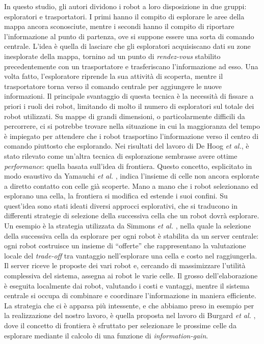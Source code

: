 In questo studio, gli autori dividono i robot a loro disposizione in due gruppi: esploratori e trasportatori. 
I primi hanno il compito di esplorare le aree della mappa ancora sconosciute, mentre i secondi hanno il compito di riportare l'informazione al punto di partenza, ove si suppone essere una sorta di comando centrale. 
L'idea è quella di lasciare che gli esploratori acquisiscano dati su zone inesplorate della mappa, tornino ad un punto di \textit{rendez-vous} stabilito precedentemente con un trasportatore e trasferiscano l'informazione ad esso. 
Una volta fatto, l'esploratore riprende la sua attività di scoperta, mentre il trasportatore torna verso il comando centrale per aggiungere le nuove informazioni. 
Il principale svantaggio di questa tecnica è la necessità di fissare a priori i ruoli dei robot, limitando di molto il numero di esploratori sul totale dei robot utilizzati. 
Su mappe di grandi dimensioni, o particolarmente difficili da percorrere, ci si potrebbe trovare nella situazione in cui la maggioranza del tempo è impiegato per attendere che i robot trasportino l'informazione verso il centro di comando piuttosto che esplorando. 
Nei risultati del lavoro di De Hoog \textit{et al.}, è stato rilevato come un'altra tecnica di esplorazione sembrasse avere ottime \textit{performance}: quella basata sull'idea di frontiera. 
Questo concetto, esplicitato in modo esaustivo da Yamauchi \textit{et al.} \cite{yamauchi1998frontier}, indica l'insieme di celle non ancora esplorate a diretto contatto con celle già scoperte.
Mano a mano che i robot selezionano ed esplorano una cella, la frontiera si modifica ed estende i suoi confini. 
Su quest'idea sono stati ideati diversi approcci esplorativi, che si traducono in differenti strategie di selezione della successiva cella che un robot dovrà esplorare.
Un esempio è la strategia utilizzata da Simmons \textit{et al.} \cite{simmons2000coordination}, nella quale la selezione della successiva cella da esplorare per ogni robot è stabilita da un server centrale: ogni robot costruisce un insieme di “offerte” che rappresentano la valutazione locale del \textit{trade-off} tra vantaggio nell'esplorare una cella e costo nel raggiungerla. 
Il server riceve le proposte dei vari robot e, cercando di massimizzare l'utilità complessiva del sistema, assegna ai robot le varie celle. 
Il grosso dell'elaborazione è eseguita localmente dai robot, valutando i costi e vantaggi, mentre il sistema centrale si occupa di combinare e coordinare l'informazione in maniera efficiente.
La strategia che ci è apparsa più intessente, e che abbiamo preso in esempio per la realizzazione del nostro lavoro, è quella proposta nel lavoro di Burgard \textit{et al.} \cite{burgard2005}, dove il concetto di frontiera è sfruttato per selezionare le prossime celle da esplorare mediante il calcolo di una funzione di \textit{information-gain}.
